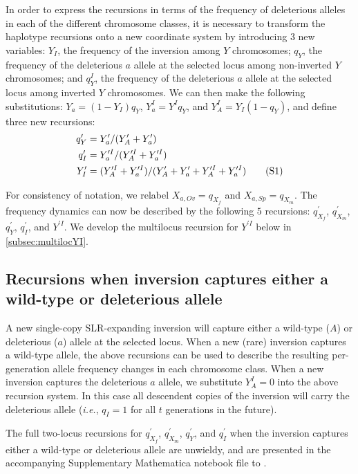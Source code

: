 \documentclass{article}
\newcommand\numberthis{\addtocounter{equation}{1}\tag{\theequation}}
\begin{document}
\begin{appendices}
In order to express the recursions in terms of the frequency of deleterious alleles in each of the different chromosome classes, it is necessary to transform the haplotype recursions onto a new coordinate system by introducing $3$ new variables: $Y_I$, the frequency of the inversion among $Y$ chromosomes; $q_Y$, the frequency of the deleterious $a$ allele at the selected locus among non-inverted $Y$ chromosomes; and $q^I_Y$, the frequency of the deleterious $a$ allele at the selected locus among inverted $Y$ chromosomes. We can then make the following substitutions: $Y_a = (1 - Y_I)q_Y$, $Y^I_a = Y^I q_Y$, and $Y^I_A = Y_I (1 - q_Y)$, and define three new recursions:
\begin{align*}
	q^{\prime}_Y &= Y^{\prime}_a / (Y^{\prime}_A + Y^{\prime}_a) \\
	q^{\prime}_I &= Y^{\prime I}_a / (Y^{\prime I}_A + Y^{\prime I}_a) \\
	Y^{\prime}_I &= (Y^{\prime I}_A + Y^{\prime I}_a) / (Y^{\prime}_A + Y^{\prime}_a + Y^{\prime I}_A + Y^{\prime I}_a)\numberthis
\end{align*}

\noindent For consistency of notation, we relabel $X_{a,Ov} = q_{X_f}$ and $X_{a,Sp} = q_{X_m}$. The frequency dynamics can now be described by the following $5$ recursions: $q^{\prime}_{X_f}$, $q^{\prime}_{X_m}$, $q^{\prime}_Y$, $q^{\prime}_I$, and $Y^{\prime I}$. We develop the multilocus recursion for $Y^{\prime I}$ below in \ref{subsec:multilocYI}.

\subsection{Recursions when inversion captures either a wild-type or deleterious allele}

A new single-copy SLR-expanding inversion will capture either a wild-type ($A$) or deleterious ($a$) allele at the selected locus. When a new (rare) inversion captures a wild-type allele, the above recursions can be used to describe the resulting per-generation allele frequency changes in each chromosome class. When a new inversion captures the deleterious $a$ allele, we substitute $Y^I_A = 0$ into the above recursion system. In this case all descendent copies of the inversion will carry the deleterious allele ({\itshape i.e.}, $q_I = 1$ for all $t$ generations in the future). 

The full two-locus recursions for $q^{\prime}_{X_f}$, $q^{\prime}_{X_m}$, $q^{\prime}_Y$, and $q^{\prime}_I$ when the inversion captures either a wild-type or deleterious allele are unwieldy, and are presented in the accompanying Supplementary Mathematica notebook file to \citet{Olito-etal-2022}. 


\end{appendices}
\end{document}
